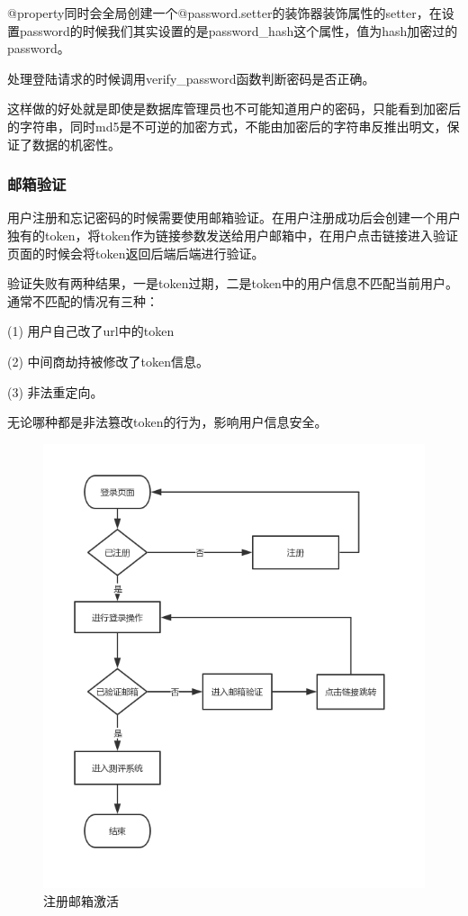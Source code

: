 @property同时会全局创建一个@password.setter的装饰器装饰属性的setter，在设置password的时候我们其实设置的是password\_hash这个属性，值为hash加密过的password。

处理登陆请求的时候调用verify\_password函数判断密码是否正确。

这样做的好处就是即使是数据库管理员也不可能知道用户的密码，只能看到加密后的字符串，同时md5是不可逆的加密方式，不能由加密后的字符串反推出明文，保证了数据的机密性。

\subsubsection{邮箱验证}

用户注册和忘记密码的时候需要使用邮箱验证。在用户注册成功后会创建一个用户独有的token，将token作为链接参数发送给用户邮箱中，在用户点击链接进入验证页面的时候会将token返回后端后端进行验证。

验证失败有两种结果，一是token过期，二是token中的用户信息不匹配当前用户。通常不匹配的情况有三种：

(1) 用户自己改了url中的token

(2) 中间商劫持被修改了token信息。

(3) 非法重定向。

无论哪种都是非法篡改token的行为，影响用户信息安全。

\begin{figure}[thbp!]
	\centering
	\includegraphics[width=1.0\linewidth]{figure/register_email}
	\caption{注册邮箱激活}
	\label{fig:register_email}
\end{figure}

